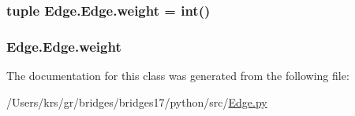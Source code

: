 \subsubsection[{weight}]{\setlength{\rightskip}{0pt plus 5cm}tuple Edge.\+Edge.\+weight = int()\hspace{0.3cm}{\ttfamily [static]}}\label{class_edge_1_1_edge_aa7dd465d78ed2c2531e23074004d2ef5}
\hypertarget{class_edge_1_1_edge_a0f1b80578fe4bafb45c269111bf9822c}{}
\subsubsection[{weight}]{\setlength{\rightskip}{0pt plus 5cm}Edge.\+Edge.\+weight}\label{class_edge_1_1_edge_a0f1b80578fe4bafb45c269111bf9822c}


The documentation for this class was generated from the following file\+:\begin{DoxyCompactItemize}
\item 
/\+Users/krs/gr/bridges/bridges17/python/src/\hyperlink{_edge_8py}{Edge.\+py}\end{DoxyCompactItemize}

